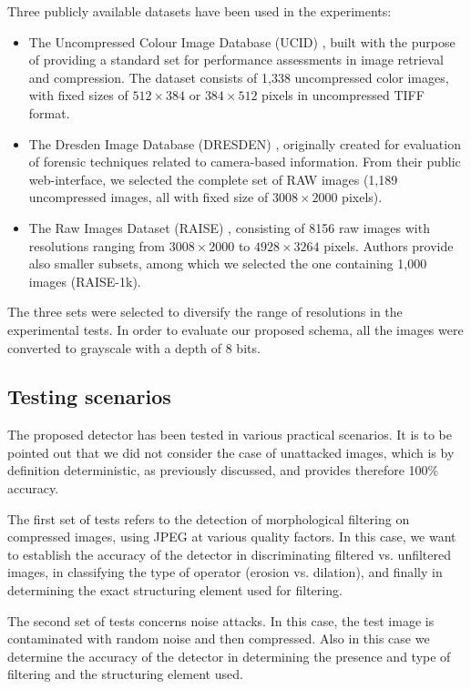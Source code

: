 \documentclass[review]{elsarticle}
\begin{document}
Three publicly available datasets have been used in the experiments:
\begin{itemize}
	\item The Uncompressed Colour Image Database (UCID) \cite{schaefer2003ucid}, built with the purpose of providing a standard set for performance assessments in image retrieval and compression. The dataset consists of 1,338 uncompressed color images, with fixed sizes of $512\times384$ or $384\times512$ pixels in uncompressed TIFF format.
	\item The Dresden Image Database (DRESDEN) \cite{gloe2010dresden}, originally created for evaluation of forensic techniques related to camera-based information. From their public web-interface, we selected the complete set of RAW images (1,189 uncompressed images, all with fixed size of $3008\times2000$ pixels).
	\item The Raw Images Dataset (RAISE) \cite{dang2015raise}, consisting of 8156 raw images with resolutions ranging from $3008\times2000$ to $4928\times3264$ pixels. Authors provide also smaller subsets, among which we selected the one containing 1,000 images (RAISE-1k).
\end{itemize}

The three sets were selected to diversify the range of resolutions in the experimental tests. In order to evaluate our proposed schema, all the images were converted to grayscale with a depth of 8 bits.

\subsection{Testing scenarios}
The proposed detector has been tested in various practical scenarios. It is to be pointed out that we did not consider the case of unattacked images, which is by definition deterministic, as previously discussed, and provides therefore 100\% accuracy.

The first set of tests refers to the detection of morphological filtering on compressed images, using JPEG at various quality factors. In this case, we want to establish the accuracy of the detector in discriminating filtered vs. unfiltered images, in classifying the type of operator (erosion vs. dilation), and finally in determining the exact structuring element used for filtering. 

The second set of tests concerns noise attacks. In this case, the test image is contaminated with random noise and then compressed. Also in this case we determine the accuracy of the detector in determining the presence and type of filtering and the structuring element used.
\end{document}
